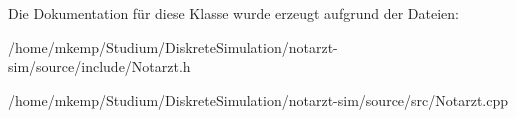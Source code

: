 Die Dokumentation für diese Klasse wurde erzeugt aufgrund der Dateien\+:\begin{DoxyCompactItemize}
\item 
/home/mkemp/\+Studium/\+Diskrete\+Simulation/notarzt-\/sim/source/include/Notarzt.\+h\item 
/home/mkemp/\+Studium/\+Diskrete\+Simulation/notarzt-\/sim/source/src/Notarzt.\+cpp\end{DoxyCompactItemize}

